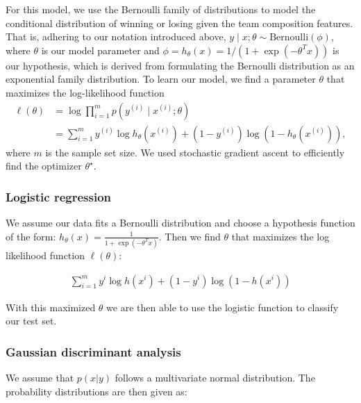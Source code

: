 \documentclass[letterpaper,10 pt,conference]{ieeeconf}
\begin{document}
For this model, we use the Bernoulli family of distributions to model the conditional distribution of winning or losing given the team composition features. That is, adhering to our notation introduced above, $y \mid x; \theta \sim \text{Bernoulli}\left(\phi\right)$, where $\theta$ is our model parameter and $\phi = h_{\theta}\left(x\right) = 1/\left(1 + \exp(-\theta^{T}x)\right)$ is our hypothesis, which is derived from formulating the Bernoulli distribution as an exponential family distribution. To learn our model, we find a parameter $\theta$ that maximizes the log-likelihood function
\begin{align}
  \ell\left(\theta\right) & = 
  \log\prod_{i=1}^{m}p\left( y^{(i)} \mid x^{(i)}; \theta \right) \\ & =
  \sum_{i=1}^{m}y^{(i)}\log h_{\theta}\left(x^{(i)}\right) + \left(1 - y^{(i)}\right)\log\left(1 - h_{\theta}\left(x^{(i)}\right)\right),
\end{align}
where $m$ is the sample set size. We used stochastic gradient ascent to efficiently find the optimizer $\theta^{\star}$. 

\subsubsection{Logistic regression} We assume our data fits a Bernoulli distribution and choose a hypothesis function of the form:  $h_{\theta}\left(x\right) = \frac{1}{1+\exp\left(-\theta^Tx\right)}$.  Then we find $\theta$ that maximizes the log likelihood function $\ell\left(\theta\right)$:

\begin{align}
\sum_{i = 1}^{m}  y^{i}\log h\left(x^{i}\right) + \left(1-y^{i}\right)\log\left(1-h\left(x^{i}\right)\right)
\label{eqn:logistic}
\end{align}

With this maximized $\theta$ we are then able to use the logistic function to classify our test set.

\subsubsection{Gaussian discriminant analysis}
We assume that $p\left(x|y\right)$ follows a multivariate normal distribution. The probability distributions are then given as:
\end{document}
